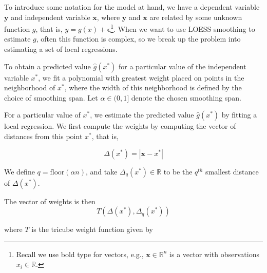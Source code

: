 \documentclass[12pt,twoside]{smiththesis}
\begin{document}
To introduce some notation for the model at hand, we have a dependent variable \(\mathbf y\) and independent variable \(\mathbf x\), where \(\mathbf y\) and \(\mathbf x\) are related by some unknown function \(g\), that is, \(y = g(x) + \boldsymbol \epsilon\)\footnote{Recall we use bold type for vectors, e.g., \(\mathbf x \in \mathbb R^n\) is a vector with observations \(x_i \in \mathbb R\).}. When we want to use LOESS smoothing to estimate \(g\), often this function is complex, so we break up the problem into estimating a set of local regressions.

To obtain a predicted value \(\hat g(x^*)\) for a particular value of the independent variable \(x^*\), we fit a polynomial with greatest weight placed on points in the neighborhood of \(x^*\), where the width of this neighborhood is defined by the choice of smoothing span. Let \(\alpha \in (0,1]\) denote the chosen smoothing span.

For a particular value of \(x^*\), we estimate the predicted value \(\hat g(x^*)\) by fitting a local regression. We first compute the weights by computing the vector of distances from this point \(x^*\), that is,

\[\Delta (x^*) = |\mathbf x -x^* | \]

We define \(q = \text{floor}(\alpha n)\), and take \(\Delta_q(x^*) \in \mathbb R\) to be the \(q^{th}\) smallest distance of \(\Delta (x^*)\).

The vector of weights is then
\[T(\Delta(x^*), \Delta_q(x^*))\]

where \(T\) is the tricube weight function given by
\end{document}

